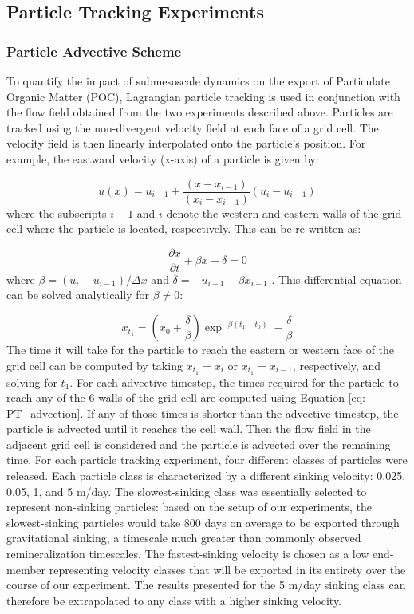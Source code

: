 \documentclass[draft,linenumbers]{agujournal2018}
\begin{document}
\subsection{Particle Tracking Experiments}

\subsubsection{Particle Advective Scheme}
To quantify the impact of submesoscale dynamics on the export of Particulate Organic Matter (POC), Lagrangian particle tracking is used in conjunction with the flow field obtained from the two experiments described above. Particles are tracked using the non-divergent velocity field at each face of a grid cell. The velocity field is then linearly interpolated onto the particle's position. For example, the eastward velocity (x-axis) of a particle is given by:

\begin{equation}
u(x) = u_{i-1} + \frac{(x - x_{i-1})}{(x_i - x_{i-1})}(u_{i}-u_{i-1})
\end{equation}
where the subscripts $i-1$ and $i$ denote the western and eastern walls of the grid cell where the particle is located, respectively. This can be re-written as:

\begin{equation}
\frac{\partial x}{\partial t} + \beta x + \delta =  0
\label{eq: eq_diff}
\end{equation}
where $\beta = (u_{i}-u_{i-1})/\Delta x$ and $\delta = -u_{i-1} - \beta x_{i-1}$ \citep{Doos_2013}. This differential equation can be solved analytically for $\beta \neq 0$:

\begin{equation}
x_{t_1} = \left(x_0 + \frac{\delta}{\beta}\right)\exp^{-\beta(t_1 - t_0)} - \frac{\delta}{\beta}
\label{eq: PT_advection}
\end{equation}
The time it will take for the particle to reach the eastern or western face of the grid cell can be computed by taking $x_{t_1} = x_i$ or $x_{t_1} = x_{i-1}$, respectively, and solving for $t_1$. For each advective timestep, the times required for the particle to reach any of the 6 walls of the grid cell are computed using Equation \ref{eq: PT_advection}. If any of those times is shorter than the advective timestep, the particle is advected until it reaches the cell wall. Then the flow field in the adjacent grid cell is considered and the particle is advected over the remaining time. For each particle tracking experiment, four different classes of particles were released. Each particle class is characterized by a different sinking velocity: 0.025, 0.05, 1, and 5 m/day. The slowest-sinking class was essentially selected to represent non-sinking particles: based on the setup of our experiments, the slowest-sinking particles would take 800 days on average to be exported through gravitational sinking, a timescale much greater than commonly observed remineralization timescales. The fastest-sinking velocity is chosen as a low end-member representing velocity classes that will be exported in its entirety over the course of our experiment. The results presented for the 5 m/day sinking class can therefore be extrapolated to any class with a higher sinking velocity. 
\end{document}
